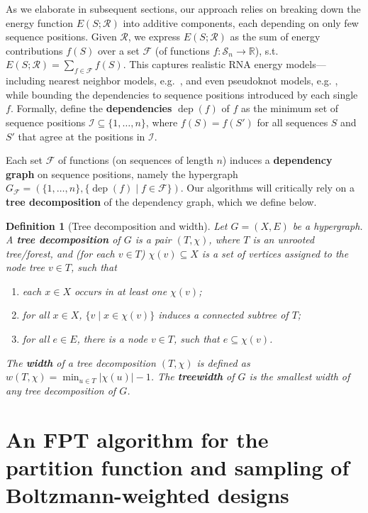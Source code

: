 \documentclass{bioinfo}
\newtheorem{definition}[theorem]{Definition}
\newcommand{\dep}{\operatorname{dep}}
\newcommand{\real}{\mathbb{R}}
\newcommand{\F}{\mathcal{F}}
\newcommand{\I}{\mathcal{I}}
\newcommand{\R}{\mathcal{R}}
\renewcommand{\S}{\mathcal{S}}
\newcommand{\width}{w}
\newcommand{\Def}[1]{{\bfseries #1}}
\newcommand{\Energy}[2]{E(#2;#1)}
\begin{document}
%
  As we elaborate in subsequent sections, our approach relies on
  breaking down the energy function $\Energy{\R}{S}$ into additive
  components, each depending on only few sequence positions. Given
  $\R$, we express $\Energy{\R}{S}$ as the sum of energy contributions $f(S)$
  over a set $\F$ (of functions $f:\S_n\to\real$),
  s.t.~$\Energy{\R}{S}=\sum_{f\in\F} f(S)$. This captures realistic RNA
  energy models---including nearest neighbor models,
  e.g.~\citet{Turner2009}, and even pseudoknot models,
  e.g. \citet{Andronescu2010}, while bounding the dependencies to
  sequence positions introduced by each single $f$. Formally, define
  the \Def{dependencies} $\dep(f)$ of $f$ as the minimum set of sequence
  positions $\I\subseteq\{1,\dots,n\}$, where $f(S)=f(S')$ for all
  sequences $S$ and $S'$ that agree at the positions in $\I$.

  Each set $\F$ of functions (on sequences of length $n$) induces a
  \Def{dependency graph} on sequence positions, namely the hypergraph
  $G_\F=(\{1,\dots,n\} ,\{\dep(f)\mid f\in \F\})$.  Our algorithms
  will critically rely on a \Def{tree decomposition} of the dependency
  graph, which we define below.
\begin{definition}[Tree decomposition and width]
  \label{def:treedecomp}
  Let $G=(X, E)$ be a hypergraph. A \Def{tree decomposition} of $G$ is
  a pair $(T,\chi)$, where $T$ is an unrooted tree/forest, and (for
  each $v\in T$) $\chi(v)\subseteq X$ is a set of vertices assigned to
  the node tree $v\in T$, such that
\begin{enumerate}
\item each $x\in X$ occurs in at least one $\chi(v)$;
\item for all $x\in X$, $\{ v \mid x \in \chi(v) \}$ induces a connected subtree of $T$;
\item for all $e\in E$, there is a node $v\in T$, such that $e\subseteq\chi(v)$.
\end{enumerate}
The \Def{width} of a tree decomposition $(T,\chi)$ is defined as
$\width(T,\chi) = \min_{u\in T} |\chi(u)| - 1 $. The \Def{treewidth}
of $G$ is the smallest width of any tree decomposition of $G$.
\end{definition}


\section{An FPT algorithm for the partition function and sampling of Boltzmann-weighted designs}
\label{sec:FPT}
\end{document}
